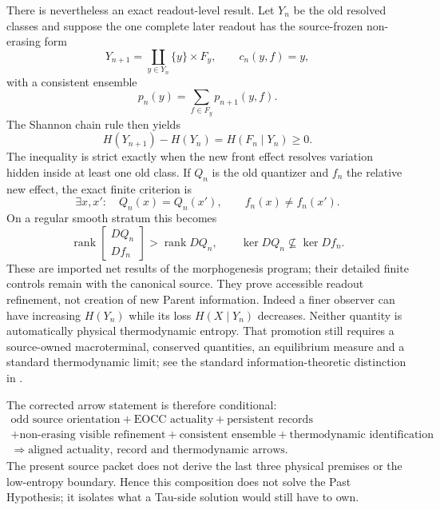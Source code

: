 \documentclass[11pt]{article}
\begin{document}
There is nevertheless an exact readout-level result.  Let \(Y_n\) be the old
resolved classes and suppose the one complete later readout has the
source-frozen non-erasing form
\begin{equation}
 Y_{n+1}=\coprod_{y\in Y_n}\{y\}\times F_y,
 \qquad c_n(y,f)=y,
 \label{eq:visible-refinement}
\end{equation}
with a consistent ensemble
\begin{equation}
 p_n(y)=\sum_{f\in F_y}p_{n+1}(y,f).
 \label{eq:refinement-marginal}
\end{equation}
The Shannon chain rule then yields
\begin{equation}
 \boxed{H(Y_{n+1})-H(Y_n)=H(F_n\mid Y_n)\ge0.}
 \label{eq:readout-entropy-increment}
\end{equation}
The inequality is strict exactly when the new front effect resolves variation
hidden inside at least one old class.  If \(Q_n\) is the old quantizer and
\(f_n\) the relative new effect, the exact finite criterion is
\begin{equation}
 \exists x,x':\quad Q_n(x)=Q_n(x'),\qquad f_n(x)\ne f_n(x').
 \label{eq:front-nonfactorization}
\end{equation}
On a regular smooth stratum this becomes
\begin{equation}
 \operatorname{rank}\!\begin{bmatrix}DQ_n\\Df_n\end{bmatrix}
 >\operatorname{rank}DQ_n,
 \qquad
 \ker DQ_n\not\subseteq\ker Df_n.
 \label{eq:front-rank-novelty}
\end{equation}
These are imported net results of the morphogenesis program; their detailed
finite controls remain with the canonical source.  They prove accessible
readout refinement, not creation of new Parent information.  Indeed a finer
observer can have increasing \(H(Y_n)\) while its loss
\(H(X\mid Y_n)\) decreases.  Neither quantity is automatically physical
thermodynamic entropy.  That promotion still requires a source-owned
macroterminal, conserved quantities, an equilibrium measure and a standard
thermodynamic limit; see the standard information-theoretic distinction in
\citet{CoverThomas2006}.

The corrected arrow statement is therefore conditional:
\begin{equation}
 \boxed{\begin{gathered}
 \text{odd source orientation}+\text{EOCC actuality}
 +\text{persistent records}\\
 +\text{non-erasing visible refinement}+\text{consistent ensemble}
 +\text{thermodynamic identification}\\
 \Longrightarrow
 \text{aligned actuality, record and thermodynamic arrows}.
 \end{gathered}}
 \label{eq:arrow-alignment-packet}
\end{equation}
The present source packet does not derive the last three physical premises or
the low-entropy boundary.  Hence this composition does not solve the Past
Hypothesis; it isolates what a Tau-side solution would still have to own.
\end{document}
